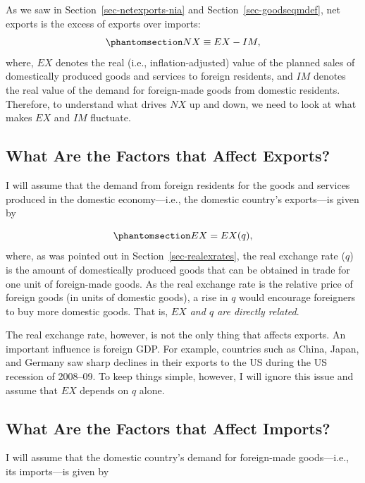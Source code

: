 \documentclass[
  letterpaper,
]{book}
\theoremstyle{plain}
\theoremstyle{remark}
\begin{document}
As we saw in Section~\ref{sec-netexports-nia} and
Section~\ref{sec-goodseqmdef}, net exports is the excess of exports over
imports: \begin{equation}\phantomsection\label{eq-nxp}{
NX\equiv EX-IM,
}\end{equation} where, \(EX\) denotes the real (i.e.,
inflation-adjusted) value of the planned sales of domestically produced
goods and services to foreign residents, and \(IM\)
denotes the real value of the demand for foreign-made goods from
domestic residents. Therefore, to understand what drives
\(NX\) up and down, we need to look at what makes \(EX\) and \(IM\)
fluctuate.

\subsection{What Are the Factors that Affect
Exports?}\label{sec-exports}

I will assume that the demand from foreign residents for the goods and
services produced in the domestic economy---i.e., the domestic country's
exports---is given by

\begin{equation}\phantomsection\label{eq-exp}{
EX=EX(q),
}\end{equation} where, as was pointed out in
Section~\ref{sec-realexrates}, the real exchange rate (\(q\)) is the
amount of domestically produced goods that can be obtained in trade for
one unit of foreign-made goods. As the real exchange rate is the
relative price of foreign goods (in units of domestic goods), a rise in
\(q\) would encourage foreigners to buy more domestic goods. That is,
\emph{\(EX\) and \(q\) are directly related}.

The real exchange rate, however, is not the only thing that affects
exports. An important influence is foreign GDP. For example, countries
such as China, Japan, and Germany saw sharp declines in their exports to
the US during the US recession of 2008--09. To keep things simple,
however, I will ignore this issue and assume that \(EX\) depends on
\(q\) alone.

\subsection{What Are the Factors that Affect
Imports?}\label{sec-imports}

I will assume that the domestic country's demand for foreign-made
goods---i.e., its imports---is given by
\end{document}
